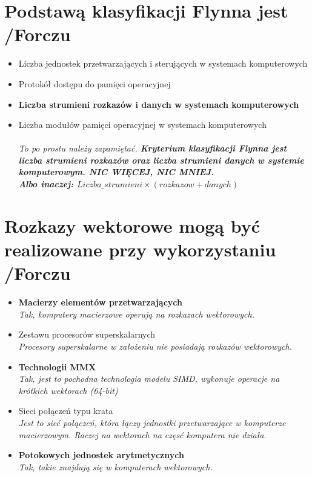 \documentclass[a4paper,twoside]{article}
\begin{document}
\section{Podstawą klasyfikacji Flynna jest {\small /Forczu}}
	\begin{itemize}
    \item Liczba jednostek przetwarzających i sterujących w systemach komputerowych
    \item Protokół dostępu do pamięci operacyjnej
    \item \textbf{Liczba strumieni rozkazów i danych w systemach komputerowych}
    \item Liczba modułów pamięci operacyjnej w systemach komputerowych\\\\
    {\small \emph{To po prostu należy zapamiętać. \textbf{Kryterium klasyfikacji Flynna jest \emph{liczba strumieni rozkazów} oraz \emph{liczba strumieni danych} w systemie komputerowym. NIC WIĘCEJ, NIC MNIEJ.\\
    Albo inaczej: \emph{$Liczba\_strumieni\times(rozkazow+danych)$}}}}
    \end{itemize}

\section{Rozkazy wektorowe mogą być realizowane przy wykorzystaniu  {\small /Forczu}}
	\begin{itemize}
    \item \textbf{Macierzy elementów przetwarzających}\\
    {\small \emph{Tak, komputery macierzowe operują na rozkazach wektorowych.}}
    \item Zestawu procesorów superskalarnych\\
    {\small \emph{Procesory superskalarne w założeniu nie posiadają rozkazów wektorowych.}}
    \item \textbf{Technologii MMX}\\
    {\small \emph{Tak, jest to pochodna technologia modelu SIMD, wykonuje operacje na krótkich wektorach (64-bit)}}
    \item Sieci połączeń typu krata\\
    {\small \emph{Jest to sieć połączeń, która łączy jednostki przetwarzające w komputerze macierzowym. Raczej na wektorach na częsć komputera nie działa.}}
    \item \textbf{Potokowych jednostek arytmetycznych}\\
    {\small \emph{Tak, takie znajdują się w komputerach wektorowych.}}
    \end{itemize}
\end{document}
